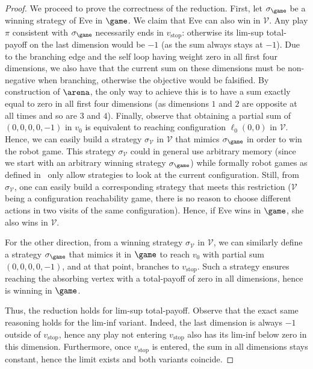 \begin{proof}
We proceed to prove the correctness of the reduction. First, let $\sigma_{\game}$ be a winning strategy of Eve in $\game$. We claim that Eve can also win in $\mathcal{V}$. Any play $\pi$ consistent with $\sigma_{\game}$ necessarily ends in $v_{\text{stop}}$: otherwise its lim-sup total-payoff on the last dimension would be $-1$ (as the sum always stays at $-1$). Due to the branching edge and the self loop having weight zero in all first four dimensions, we also have that the current sum on these dimensions must be non-negative when branching, otherwise the objective would be falsified. By construction of $\arena$, the only way to achieve this is to have a sum exactly equal to zero in all first four dimensions (as dimensions $1$ and $2$ are opposite at all times and so are $3$ and $4$). Finally, observe that obtaining a partial sum of $(0, 0, 0, 0, -1)$ in $v_0$ is equivalent to reaching configuration $\ell_0(0, 0)$ in $\mathcal{V}$. Hence, we can easily build a strategy $\sigma_{\mathcal{V}}$ in $\mathcal{V}$ that mimics $\sigma_{\game}$ in order to win the robot game. This strategy $\sigma_{\mathcal{V}}$ could in general use arbitrary memory (since we start with an arbitrary winning strategy $\sigma_{\game}$) while formally robot games as defined in~\cite{Niskanen&Potapov&Reichert:2016} only allow strategies to look at the current configuration. Still, from $\sigma_{\mathcal{V}}$, one can easily build a corresponding strategy that meets this restriction ($\mathcal{V}$ being a configuration reachability game, there is no reason to choose different actions in two visits of the same configuration). Hence, if Eve wins in $\game$, she also wins in $\mathcal{V}$.

For the other direction, from a winning strategy $\sigma_{\mathcal{V}}$ in $\mathcal{V}$, we can similarly define a strategy $\sigma_{\game}$ that mimics it in $\game$ to reach $v_0$ with partial sum $(0, 0, 0, 0, -1)$, and at that point, branches to $v_{\text{stop}}$. Such a strategy ensures reaching the absorbing vertex with a total-payoff of zero in all dimensions, hence is winning in $\game$.

Thus, the reduction holds for lim-sup total-payoff. Observe that the exact same reasoning holds for the lim-inf variant. Indeed, the last dimension is always $-1$ outside of $v_{\text{stop}}$, hence any play not entering $v_{\text{stop}}$ also has its lim-inf below zero in this dimension. Furthermore, once $v_{\text{stop}}$ is entered, the sum in all dimensions stays constant, hence the limit exists and both variants coincide.
\end{proof}

